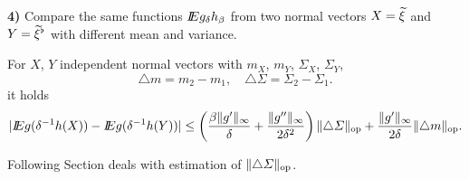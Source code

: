 \noindent\textbf{4)}  Compare the same functions $I\!\!E g_\delta h_\beta$ from two normal vectors $X = \widetilde{\xi}$ and $Y  = \widetilde{\xi}^{\flat}$ with different mean and variance.

\begin{lemma}
For $X$, $Y$ independent normal vectors with $m_X$, $m_Y$, $\Sigma_X$, $\Sigma_Y$,
\[
\triangle m = m_2 - m_1,
\quad
\triangle \Sigma = \Sigma_2 - \Sigma_1.
\] 
it holds
\[
| I\!\!E g(\delta^{-1} h(X)) - I\!\!E g(\delta^{-1} h(Y)) | 
\leq 
\left( 
\frac{\beta \Vert g' \Vert_\infty}{\delta} + \frac{\Vert g'' \Vert_\infty }{2 \delta^2}
\right) \Vert \triangle \varSigma \Vert_{\operatorname{op}} + 
\frac{ \Vert g' \Vert_\infty}{2 \delta} \Vert \triangle m \Vert_{\operatorname{op}} .
\]
\end{lemma}   

Following Section deals with estimation of $\Vert \triangle \varSigma \Vert_{\operatorname{op}}$.